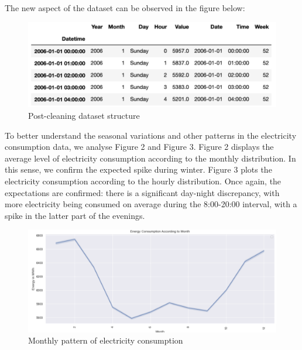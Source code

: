 \documentclass[10pt,twocolumn,letterpaper]{article}
\begin{document}
The new aspect of the dataset can be observed in the figure below: 

\begin{figure}[H]
\begin{center}
   \includegraphics[width=\linewidth]{midterm-report-latex/Data2.png}
\end{center}
   \caption{Post-cleaning dataset structure}
\end{figure}
To better understand the seasonal variations and other patterns in the electricity consumption data, we analyse Figure 2 and Figure 3. Figure 2 displays the average level of electricity consumption according to the monthly distribution. In this sense, we confirm the expected spike during winter. Figure 3 plots the electricity consumption according to the hourly distribution. Once again, the expectations are confirmed: there is a significant day-night discrepancy, with more electricity being consumed on average during the 8:00-20:00 interval, with a spike in the latter part of the evenings.

\begin{figure}[H]
\begin{center}
   \includegraphics[width=\linewidth]{midterm-report-latex/month.png}
\end{center}
   \caption{Monthly pattern of electricity consumption}
\end{figure}
\end{document}
